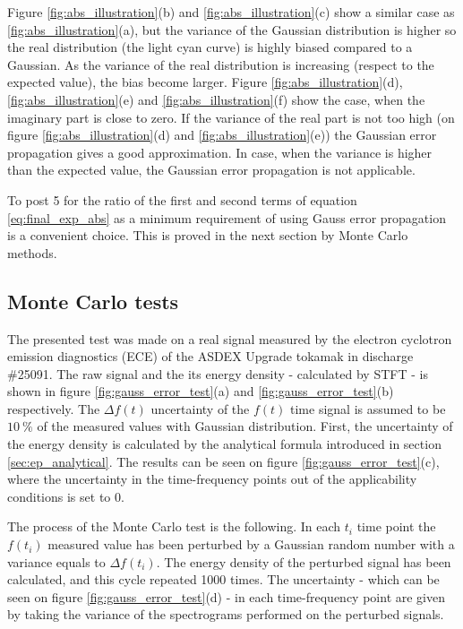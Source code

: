 \documentclass[a4paper,12pt,oneside]{article}
\begin{document}
Figure \ref{fig:abs_illustration}(b) and \ref{fig:abs_illustration}(c) show a similar case as \ref{fig:abs_illustration}(a), but the variance of the Gaussian distribution is higher so the real distribution (the light cyan curve) is highly biased compared to a Gaussian. As the variance of the real distribution is increasing (respect to the expected value), the bias become larger. Figure \ref{fig:abs_illustration}(d), \ref{fig:abs_illustration}(e) and \ref{fig:abs_illustration}(f) show the case, when the imaginary part is close to zero. If the variance of the real part is not too high (on figure \ref{fig:abs_illustration}(d) and \ref{fig:abs_illustration}(e)) the Gaussian error propagation gives a good approximation. In case, when the variance is higher than the expected value, the Gaussian error propagation is not applicable.


To post 5 for the ratio of the first and second terms of equation \eqref{eq:final_exp_abs} as a minimum requirement of using Gauss error propagation is a convenient choice. This is proved in the next section by Monte Carlo methods.

\subsection{Monte Carlo tests}

The presented test was made on a real signal measured by the electron cyclotron emission diagnostics (ECE) of the ASDEX Upgrade tokamak in discharge \#25091. The raw signal and the its energy density - calculated by STFT - is shown in figure \ref{fig:gauss_error_test}(a) and \ref{fig:gauss_error_test}(b) respectively. The $\Delta f(t)$ uncertainty of the $f(t)$ time signal is assumed to be $10\ \%$ of the measured values with Gaussian distribution. First, the uncertainty of the energy density is calculated by the analytical formula introduced in section \ref{sec:ep_analytical}. The results can be seen on figure \ref{fig:gauss_error_test}(c), where the uncertainty in the time-frequency points out of the applicability conditions is set to 0.

The process of the Monte Carlo test is the following. In each $t_i$ time point the $f(t_i)$ measured value has been perturbed by a Gaussian random number with a variance equals to $\Delta f(t_i)$. The energy density of the perturbed signal has been calculated, and this cycle repeated 1000 times. The uncertainty -  which can be seen on figure \ref{fig:gauss_error_test}(d) - in each time-frequency point are given by taking the variance of the spectrograms performed on the perturbed signals.
\end{document}

